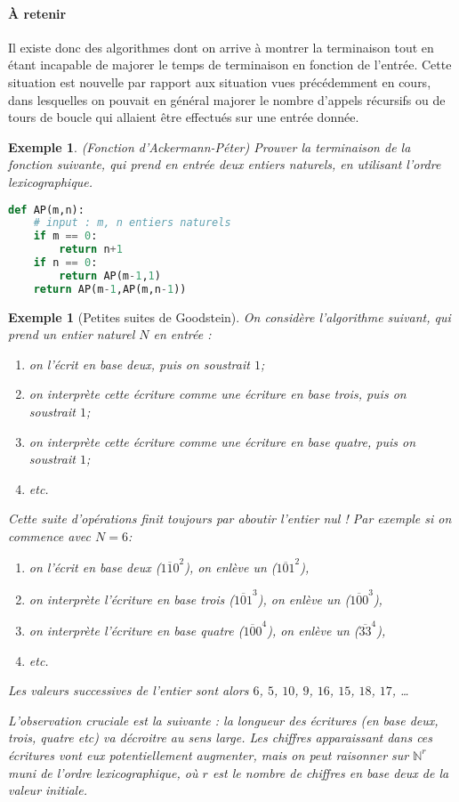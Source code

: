 \documentclass[12pt]{article}
\newtheorem{exemple}[thm]{Exemple}
\newcommand{\N}{\mathbb{N}}
\begin{document}
\paragraph{À retenir}
Il existe donc des algorithmes dont on arrive à montrer la terminaison tout en étant incapable de majorer le temps de terminaison en fonction de l'entrée.
Cette situation est nouvelle par rapport aux situation vues précédemment en cours, dans lesquelles on pouvait en général majorer le nombre d'appels récursifs ou de tours de boucle qui allaient être effectués sur une entrée donnée.

\begin{exemple}(Fonction d'Ackermann-Péter)
Prouver la terminaison de la fonction suivante, qui prend en entrée deux entiers naturels, en utilisant l'ordre lexicographique.
\begin{lstlisting}[language=Python]
def AP(m,n):
	# input : m, n entiers naturels
	if m == 0:
		return n+1
	if n == 0:
		return AP(m-1,1)
	return AP(m-1,AP(m,n-1))
\end{lstlisting}
\end{exemple}



\begin{exemple}[Petites suites de Goodstein]%
On considère l'algorithme suivant, qui prend un entier naturel $N$ en entrée :
\begin{enumerate}
\item on l'écrit en base deux, puis on soustrait $1$;
\item on interprète cette écriture comme une écriture en base trois, puis on soustrait $1$;
\item on interprète cette écriture comme une écriture en base quatre, puis on soustrait $1$;
\item etc.
\end{enumerate}
Cette suite d'opérations finit toujours par aboutir  l'entier nul !
Par exemple si on commence avec $N=6$:
\begin{enumerate}
\item on l'écrit en base deux ($\overline{110}^2$), on enlève un  ($\overline{101}^2$), 
\item on interprète l'écriture en base trois ($\overline{101}^3$), on enlève un ($\overline{100}^3$),
\item on interprète l'écriture en base quatre ($\overline{100}^4$), on enlève un ($\overline{33}^4$),
\item etc.
\end{enumerate} 
Les valeurs successives de l'entier sont alors $6$, $5$, $10$, $9$, $16$, $15$, $18$, $17$, \dots

L'observation cruciale est la suivante : la longueur des écritures (en base deux, trois, quatre etc) va décroitre au sens large.
Les chiffres apparaissant dans ces écritures vont eux potentiellement augmenter, mais on peut raisonner sur $\N^r$ muni de l'ordre lexicographique, où $r$ est le nombre de chiffres en base deux de la valeur initiale.
\end{exemple}
\end{document}
